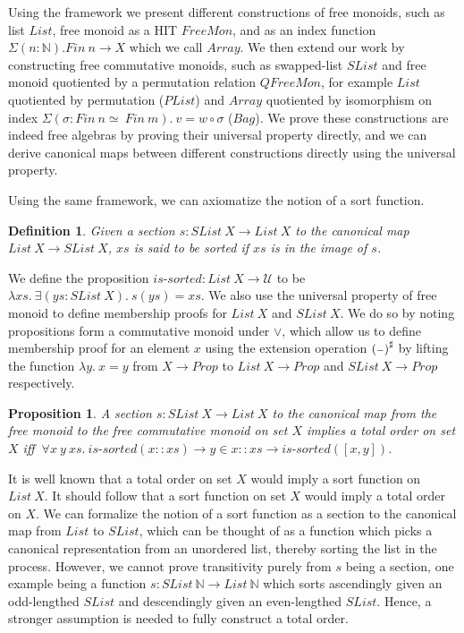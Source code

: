 \documentclass{article}
\begin{document}
Using the framework we present different constructions of free monoids,
such as list $List$, free monoid as a HIT $FreeMon$, and as an index function $\Sigma (n : \mathbb{N}). Fin \: n \rightarrow X$ which we call $Array$.
We then extend our work by constructing free commutative monoids,
such as swapped-list $SList$ and free monoid quotiented by a permutation relation $QFreeMon$,
for example $List$ quotiented by permutation ($PList$)
and $Array$ quotiented by isomorphism on index $\Sigma (\sigma : Fin \: n \simeq \: Fin \: m). \: v = w \circ \sigma$ ($Bag$).
We prove these constructions are indeed free algebras by proving their universal property directly,
and we can derive canonical maps between different constructions directly using the universal property.

Using the same framework, we can axiomatize the notion of a sort function.

\newtheorem{myconj}{Conjecture}
\newtheorem{mydef}{Definition}
\newtheorem{mylemma}{Lemma}
\newtheorem{mythm}{Proposition}

\begin{mydef}
    Given a section $s : SList \: X \rightarrow List \: X$ to the canonical map $List \: X \rightarrow SList \: X$,
    $xs$ is said to be sorted if $xs$ is in the image of $s$.
\end{mydef}

We define the proposition $\textit{is-sorted} : List \: X \rightarrow \mathcal{U}$ to be
$\lambda xs. \: \exists (ys : SList \: X). \: s(ys) = xs$.
We also use the universal property of free monoid to define membership proofs for $List \: X$ and $SList \: X$.
We do so by noting propositions form a commutative monoid under $\vee$,
which allow us to define membership proof for an element $x$ using the extension operation ${({\scriptstyle{-}})}^{\sharp}$
by lifting the function $\lambda y. \: x = y$ from $X \rightarrow Prop$ to $List \: X \rightarrow Prop$ and $SList \: X \rightarrow Prop$ respectively.

\begin{mythm}
    A section $s : SList \: X \rightarrow List \: X$ to the canonical map from the free monoid to the free commutative monoid on set $X$
    implies a total order on set $X$ iff
    $\: \forall x \: y \: xs. \: \textit{is-sorted}(x :: xs) \rightarrow y \in x :: xs \rightarrow \textit{is-sorted}([x, y])$.
\end{mythm}
It is well known that a total order on set $X$ would imply a sort function on $List \: X$. It should follow that a sort function on set $X$
would imply a total order on $X$. We can formalize the notion of a sort function as a section to the canonical map from $List$ to
$SList$, which can be thought of as a function which picks a canonical representation from an unordered list, thereby sorting
the list in the process. However, we cannot prove transitivity purely from $s$ being a section, one example being
a function $s : SList \: \mathbb{N} \rightarrow List \: \mathbb{N}$ which sorts ascendingly given an odd-lengthed
$SList$ and descendingly given an even-lengthed $SList$. Hence, a stronger assumption is needed to fully construct
a total order.
\end{document}
